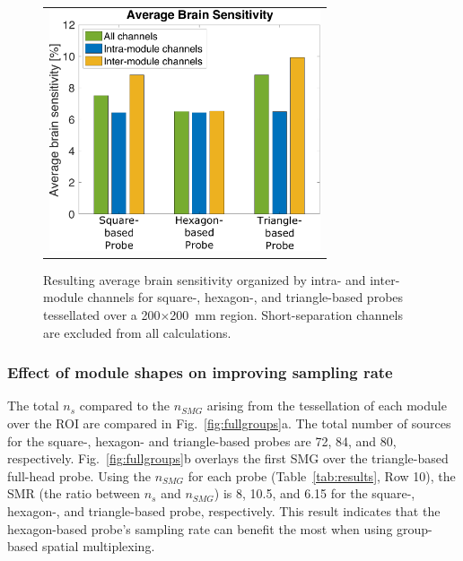 \begin{figure}
    \begin{center}
    \begin{tabular}{c}
    \includegraphics[width=8cm]{fig/moca/Fig_6.pdf}
    \end{tabular}
    \end{center}
    \caption {Resulting average brain sensitivity organized by intra- and inter-module channels for square-, hexagon-, and triangle-based probes tessellated over a 200$\times$200~mm region. Short-separation channels are excluded from all calculations.} 
    \label{fig:fullbrainsensitivity}
\end{figure} 


\subsubsection{Effect of module shapes on improving sampling rate}
The total $n_s$ compared to the $n_{SMG}$ arising from the tessellation of each module over the \ac{ROI} are compared in Fig.~\ref{fig:fullgroups}a. The total number of sources for the square-, hexagon- and triangle-based probes are 72, 84, and 80, respectively. Fig.~\ref{fig:fullgroups}b overlays the first \ac{SMG} over the triangle-based full-head probe. Using the $n_{SMG}$ for each probe (Table~\ref{tab:results}, Row 10), the \ac{SMR} (the ratio between $n_s$ and $n_{SMG}$) is 8, 10.5, and 6.15 for the square-, hexagon-, and triangle-based probe, respectively. This result indicates that the hexagon-based probe's sampling rate can benefit the most when using  group-based spatial multiplexing.

